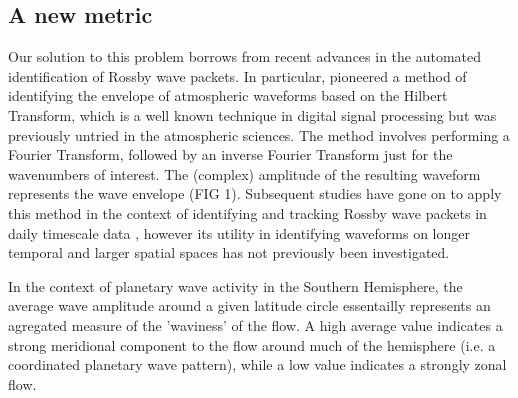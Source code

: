 \subsection{A new metric}

Our solution to this problem borrows from recent advances in the automated identification of Rossby wave packets. In particular, \citet{Zimin2003} pioneered a method of identifying the envelope of atmospheric waveforms based on the Hilbert Transform, which is a well known technique in digital signal processing but was previously untried in the atmospheric sciences. The method involves performing a Fourier Transform, followed by an inverse Fourier Transform just for the wavenumbers of interest. The (complex) amplitude of the resulting waveform represents the wave envelope (FIG 1). Subsequent studies have gone on to apply this method in the context of identifying and tracking Rossby wave packets in daily timescale data \citep{Glatt2014,Souders2014a}, however its utility in identifying waveforms on longer temporal and larger spatial spaces has not previously been investigated.

In the context of planetary wave activity in the Southern Hemisphere, the average wave amplitude around a given latitude circle essentailly represents an agregated measure of the 'waviness' of the flow. A high average value indicates a strong meridional component to the flow around much of the hemisphere (i.e. a coordinated planetary wave pattern), while a low value indicates a strongly zonal flow.

